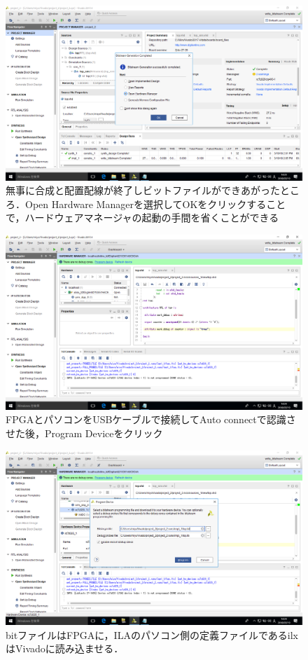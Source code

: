 \documentclass[a4paper,dvipdfmx]{jsarticle}
\begin{document}
 \begin{figure}[H]
  \begin{center}
   \includegraphics[width=.8\textwidth]{chapter05_figures/VirtualBox_Windows10_19_03_2018_14_23_17.png}
  \end{center}
  \caption{無事に合成と配置配線が終了しビットファイルができあがったところ．Open Hardware Managerを選択してOKをクリックすることで，ハードウェアマネージャの起動の手間を省くことができる}
 \end{figure}

 \begin{figure}[H]
  \begin{center}
   \includegraphics[width=.8\textwidth]{chapter05_figures/VirtualBox_Windows10_19_03_2018_14_23_59.png}
  \end{center}
  \caption{FPGAとパソコンをUSBケーブルで接続してAuto connectで認識させた後，Program Deviceをクリック}
 \end{figure}

 \begin{figure}[H]
  \begin{center}
   \includegraphics[width=.8\textwidth]{chapter05_figures/VirtualBox_Windows10_19_03_2018_14_24_06.png}
  \end{center}
  \caption{bitファイルはFPGAに，ILAのパソコン側の定義ファイルであるilxはVivadoに読み込ませる．}
 \end{figure}
\end{document}
